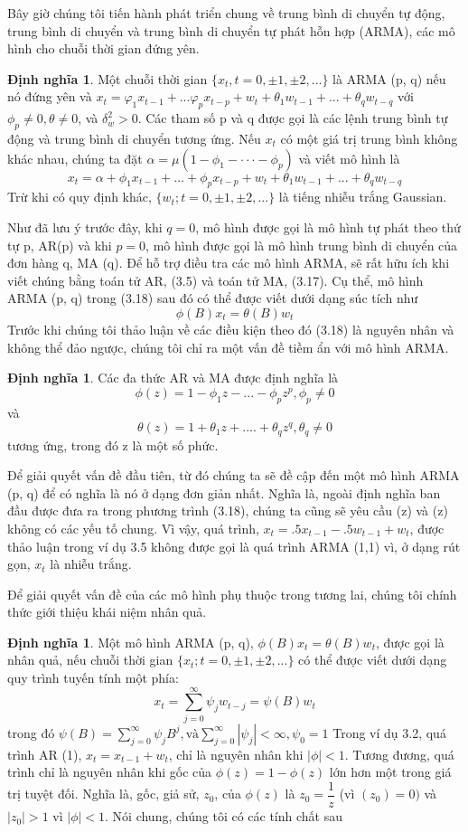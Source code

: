 \documentclass[12pt, a4paper,oneside]{book}
\theoremstyle{definition}
\newtheorem{dn}[theo]{Định nghĩa}
\begin{document}
Bây giờ chúng tôi tiến hành phát triển chung về trung bình di chuyển tự động, trung bình di chuyển và trung bình di chuyển tự phát hỗn hợp (ARMA), các mô hình cho chuỗi thời gian đứng yên.
\begin{dn}
	Một chuỗi thời gian $ \{x_{t}, t=0,\pm1,\pm2,...\}$ là ARMA (p, q) nếu nó đứng yên và $ x_{t}= \varphi_{1}x_{t-1}+...\varphi_{p}x_{t-p} + w_{t} + \theta_{1}w_{t-1}+...+ \theta_{q}w_{t-q}$ với $\phi_{p} \neq 0, \theta \neq $0, và $\delta_{w}^{2}> 0$. Các tham số p và q được gọi là các lệnh trung bình tự động và trung bình di chuyển tương ứng. Nếu $x_{t}$ có một giá trị trung bình không khác nhau, chúng ta đặt $\alpha = \mu(1 − \phi_{1} -··· −\phi_{p})$ và viết mô hình là
	$$x_{t}= \alpha + \phi_{1}x_{t-1}+...+\phi_{p}x_{t-p}+w_{t}+\theta_{1}w_{t-1}+...+\theta_{q}w_{t-q}$$
	Trừ khi có quy định khác, $\{w_{t}; t = 0, \pm 1, \pm 2, ...\}$ là tiếng nhiễu trắng Gaussian.
	
	Như đã lưu ý trước đây, khi $q = 0$, mô hình được gọi là mô hình tự phát theo thứ tự p, AR(p) và khi $p = 0$, mô hình được gọi là mô hình trung bình di chuyển của đơn hàng q, MA (q). Để hỗ trợ điều tra các mô hình ARMA, sẽ rất hữu ích khi viết chúng bằng toán tử AR, (3.5) và toán tử MA, (3.17). Cụ thể, mô hình ARMA (p, q) trong (3.18) sau đó có thể được viết dưới dạng súc tích như
	$$\phi(B)x_{t}= \theta(B)w_{t}$$
	Trước khi chúng tôi thảo luận về các điều kiện theo đó (3.18) là nguyên nhân và không thể đảo ngược, chúng tôi chỉ ra một vấn đề tiềm ẩn với mô hình ARMA.
\end{dn}
\begin{dn}
	Các đa thức AR và MA được định nghĩa là 
	$$\phi(z)= 1 - \phi_{1}z - ... - \phi_{p}z^{p}, \phi_{p}\neq 0$$
	và
	$$\theta(z)= 1+ \theta_{1}z + ....+\theta_{q}z^{q},\theta_{q}\neq 0$$
	tương ứng, trong đó z là một số phức.
	
	Để giải quyết vấn đề đầu tiên, từ đó chúng ta sẽ đề cập đến một mô hình ARMA (p, q) để có nghĩa là nó ở dạng đơn giản nhất. Nghĩa là, ngoài định nghĩa ban đầu được đưa ra trong phương trình (3.18), chúng ta cũng sẽ yêu cầu (z) và (z) không có các yếu tố chung. Vì vậy, quá trình, $x_{t} = .5x_{t-1} - .5w_{t-1} + w_{t}$, được thảo luận trong ví dụ 3.5 không được gọi là quá trình ARMA (1,1) vì, ở dạng rút gọn, $x_{t}$ là nhiễu trắng.
	
	Để giải quyết vấn đề của các mô hình phụ thuộc trong tương lai, chúng tôi chính thức giới thiệu khái niệm nhân quả.
\end{dn}
\begin{dn}
	Một mô hình ARMA (p, q), $\phi(B)x_{t} = \theta(B)w_{t}$, được gọi là nhân quả, nếu chuỗi thời gian $\{x_{t}; t = 0, \pm 1, \pm 2, ...\}$ có thể được viết dưới dạng quy trình tuyến tính một phía:
	$$x_{t}= \sum_{j=0}^{\infty}\psi_{j}w_{t-j}= \psi(B)w_{t}$$
	trong đó $\psi(B)= \sum_{j=0}^{\infty}\psi_{j}B^{j}, \text{và} \sum_{j=0}^{\infty}|\psi_{j}|< \infty, \psi_{0}=1$
	Trong ví dụ 3.2, quá trình AR (1), $x_{t} = x_{t-1} + w_{t}$, chỉ là nguyên nhân khi $| \phi | <1$. Tương đương, quá trình chỉ là nguyên nhân khi gốc của $\phi(z) = 1- \phi (z)$ lớn hơn một trong giá trị tuyệt đối. Nghĩa là, gốc, giả sử, $z_{0}$, của $\phi(z)$ là $z_{0} = \dfrac{1}{z}$ (vì $(z_{0}) = 0)$ và $|z_{0}| > 1$ vì $|\phi| <1$. Nói chung, chúng tôi có các tính chất sau 
\end{dn}
\end{document}
